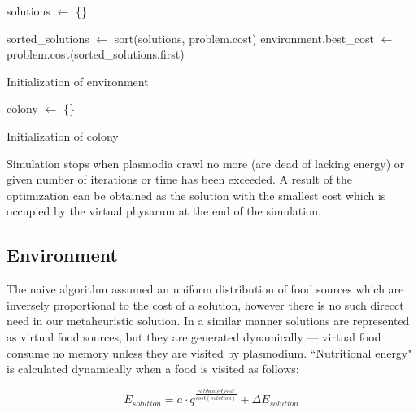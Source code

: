 \begin{algorithm}
  \BlankLine

  solutions $\leftarrow$ \{\}\;

  sorted\_solutions $\leftarrow$ sort(solutions, problem.cost)\;
  environment.best\_cost $\leftarrow$ problem.cost(sorted\_solutions.first)\;
  
  \;

  \caption{Initialization of environment}
  \label{algorithm:m_env_initialization}
\end{algorithm}

\begin{algorithm}
  \BlankLine

  colony $\leftarrow$ \{\}\;
  \;

  \caption{Initialization of colony}
  \label{algorithm:m_colony_initialization}
\end{algorithm}

Simulation stops when plasmodia crawl no more (are dead of lacking energy) or given number of iterations or time has been exceeded. A result of the optimization can be obtained as the solution with the smallest cost which is occupied by the virtual physarum at the end of the simulation.


\subsection{Environment}

The naive algorithm assumed an uniform distribution of food sources which are inversely proportional to the cost of a solution, however there is no such direcct need in our metaheuristic solution. In a similar manner solutions are represented as virtual food sources, but they are generated dynamically --- virtual food consume no memory unless they are visited by plasmodium. ``Nutritional energy" is calculated dynamically when a food is visited as follows: 

\begin{equation}
  E_{solution} = a \cdot q^{\frac{calibrated\_cost}{cost(solution)}} + {\Delta}E_{solution}
  \label{equation:m_e_solution}
\end{equation}

